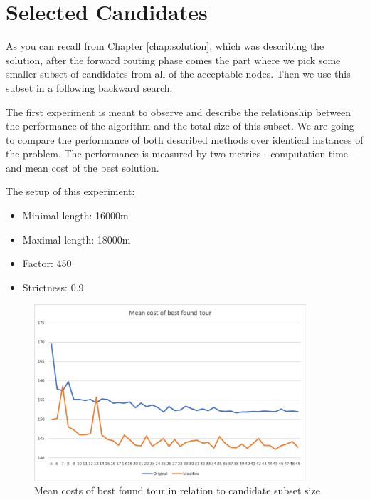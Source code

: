 \documentclass{ctuthesis}
\begin{document}
\section{Selected Candidates}
As you can recall from Chapter \ref{chap:solution}, which was describing the solution, after the forward routing phase comes the part where we pick some smaller subset of candidates from all of the acceptable nodes. Then we use this subset in a following backward search.\par The first experiment is meant to observe and describe the relationship between the performance of the algorithm and the total size of this subset. We are going to compare the performance of both described methods over identical instances of the problem. The performance is measured by two metrics - computation time and mean cost of the best solution. \par 

\begin{minipage}[t]{0.9\textwidth}
	The setup of this experiment:
	\begin{itemize}
  		\item Minimal length: 16000m
  		\item Maximal length: 18000m
  		\item Factor: 450
  		\item Strictness: 0.9
	\end{itemize}
\end{minipage}
\vspace{20px}


\begin{figure}
	\includegraphics[width=0.9\textwidth]{candsBest.png}
	\caption{Mean costs of best found tour in relation to candidate subset size}
	\label{fig:candsBest}
\end{figure} \par
\end{document}
